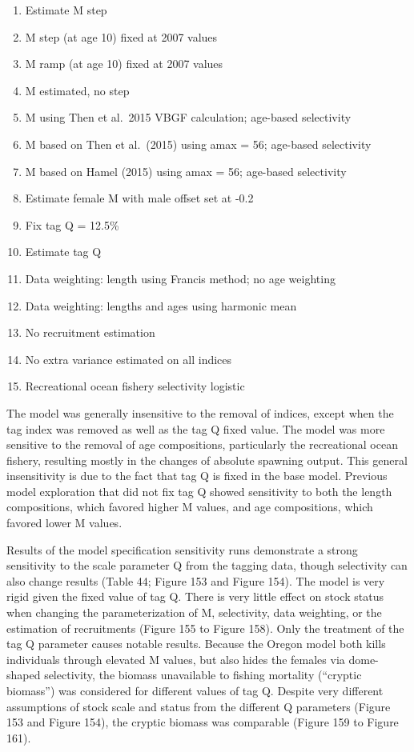 \documentclass[11pt,
  english,
  letterpaper,
]{article}
\providecommand{\tightlist}{%
  \setlength{\itemsep}{0pt}\setlength{\parskip}{0pt}}
\providecommand{\tightlist}{%
  \setlength{\itemsep}{0pt}\setlength{\parskip}{0pt}}
\begin{document}
\begin{enumerate}
\def\labelenumi{\arabic{enumi}.}
\tightlist
\item
  Estimate M step
\item
  M step (at age 10) fixed at 2007 values
\item
  M ramp (at age 10) fixed at 2007 values
\item
  M estimated, no step
\item
  M using Then et al.~2015 VBGF calculation; age-based selectivity
\item
  M based on Then et al.~(2015) using amax = 56; age-based selectivity
\item
  M based on Hamel (2015) using amax = 56; age-based selectivity
\item
  Estimate female M with male offset set at -0.2
\item
  Fix tag Q = 12.5\%
\item
  Estimate tag Q
\item
  Data weighting: length using Francis method; no age weighting
\item
  Data weighting: lengths and ages using harmonic mean
\item
  No recruitment estimation
\item
  No extra variance estimated on all indices
\item
  Recreational ocean fishery selectivity logistic
\end{enumerate}

The model was generally insensitive to the removal of indices, except when the tag index was removed as well as the tag Q fixed value. The model was more sensitive to the removal of age compositions, particularly the recreational ocean fishery, resulting mostly in the changes of absolute spawning output. This general insensitivity is due to the fact that tag Q is fixed in the base model. Previous model exploration that did not fix tag Q showed sensitivity to both the length compositions, which favored higher M values, and age compositions, which favored lower M values.

Results of the model specification sensitivity runs demonstrate a strong sensitivity to the scale parameter Q from the tagging data, though selectivity can also change results (Table 44; Figure 153 and Figure 154). The model is very rigid given the fixed value of tag Q. There is very little effect on stock status when changing the parameterization of M, selectivity, data weighting, or the estimation of recruitments (Figure 155 to Figure 158). Only the treatment of the tag Q parameter causes notable results. Because the Oregon model both kills individuals through elevated M values, but also hides the females via dome-shaped selectivity, the biomass unavailable to fishing mortality (``cryptic biomass'') was considered for different values of tag Q. Despite very different assumptions of stock scale and status from the different Q parameters (Figure 153 and Figure 154), the cryptic biomass was comparable (Figure 159 to Figure 161).
\end{document}
